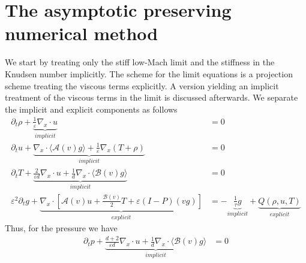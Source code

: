 \documentclass[final,11pt]{siamart251216}
\numberwithin{equation}{section}
\theoremstyle{definition}
\theoremstyle{remark}
\begin{document}
\section{The asymptotic preserving numerical  method}
\label{APfirst}
We start by treating  only the stiff low-Mach limit and the stiffness in the Knudsen number implicitly. The scheme for the limit equations is a projection scheme treating the viscous terms explicitly. A version yielding an implicit treatment of the viscous terms in the limit is discussed afterwards.
We separate  the implicit and explicit components as follows
\begin{equation}
\begin{split} \label{implicit-explicit}
\partial_t \rho +  \underbrace{\frac{1}{\varepsilon}\nabla_x \cdot u}_{implicit} &= 0 \\
\partial_t u + \underbrace{ \nabla_x \cdot \langle \mathcal{A}(v) g \rangle + \frac{1}{\varepsilon} \nabla_x (T+\rho)}_{implicit} &= 0 \\
\partial_t T +  \underbrace{\frac{2}{\varepsilon d} \nabla_x \cdot u + \frac{1}{d} \nabla_x \cdot \langle \mathcal{B}(v) g \rangle}_{implicit} &= 0\\
\varepsilon^2 \partial_t g +  \underbrace{\nabla_x \cdot \left[ \mathcal{A}(v) u + \frac{\mathcal{B}(v)}{2}T + \varepsilon (I-P)(vg) \right]}_{explicit} &= -  \underbrace{\frac{1}{\tau} g}_{implicit} + \underbrace{Q(\rho,u,T)}_{explicit}
\end{split}
\end{equation}
Thus, for the pressure we have 
\begin{equation}
\begin{split} 
\partial_t p +  \underbrace{\frac{d+2}{\varepsilon d} \nabla_x \cdot u + \frac{1}{d} \nabla_x \cdot \langle \mathcal{B}(v) g \rangle}_{implicit} &= 0\\
\end{split}
\end{equation}
\end{document}
